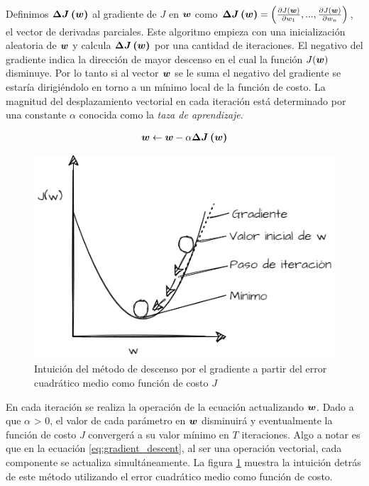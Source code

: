 Definimos $\boldsymbol{\Delta J\left( w \right)}$ al gradiente de $J$ en $\boldsymbol{w}$
como $\boldsymbol{\Delta J\left( \boldsymbol{w} \right)} = \left(\frac{\partial
J(\boldsymbol{w})}{\partial w_1}, ..., \frac{\partial J(\boldsymbol{w})}{\partial w_n}
\right)$, el vector de derivadas parciales. Este algoritmo empieza con una
inicialización aleatoria de $\boldsymbol{w}$ y calcula $\boldsymbol{\Delta J\left( w
\right)}$ por una cantidad de iteraciones. El negativo del gradiente indica la
dirección de mayor descenso en el cual la función $J(\boldsymbol{w})$ disminuye. Por
lo tanto si al vector $\boldsymbol{w}$ se le suma el negativo del gradiente se estaría
dirigiéndolo en torno a un mínimo local de la función de costo. La magnitud del
desplazamiento vectorial en cada iteración está determinado por una constante
$\alpha$ conocida como la \emph{taza de aprendizaje}.

\begin{align} \label{eq:gradient_descent}
    \boldsymbol{w} \leftarrow \boldsymbol{w} - \alpha \boldsymbol{\Delta J\left( w \right)}
\end{align}

\begin{figure}
    \centering
    \includegraphics[scale=0.5]{figures/gradient_descent_plot.png}
    \caption{Intuición del método de descenso por el gradiente a partir del error cuadrático medio como función de costo $J$}
    \label{fig:gradient_descent}
\end{figure}

En cada iteración se realiza la operación de la ecuación actualizando
$\boldsymbol{w}$. Dado a que $\alpha$ > 0, el valor de cada parámetro en $\boldsymbol{w}$
disminuirá y eventualmente la función de costo $J$ convergerá a su valor mínimo
en $T$ iteraciones. Algo a notar es que en la ecuación \ref{eq:gradient_descent},
al ser una operación vectorial, cada componente se actualiza simultáneamente. La
figura \ref{fig:gradient_descent} muestra la intuición detrás de este método
utilizando el error cuadrático medio como función de costo.

